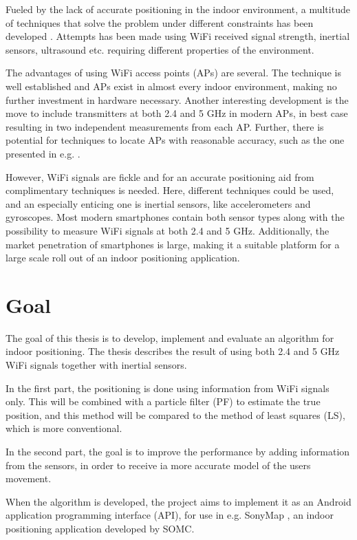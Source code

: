 \documentclass{LTHthesis}
\begin{document}
Fueled by the lack of accurate positioning in the indoor environment, a multitude of techniques that solve the problem under different constraints has been developed \cite{positioning_overview}. Attempts has been made using WiFi received signal strength, inertial sensors, ultrasound etc. requiring different properties of the environment. 

The advantages of using WiFi access points (APs) are several. The technique is well established and APs exist in almost every indoor environment, making no further investment in hardware necessary. Another interesting development is the move to include transmitters at both 2.4 and 5 GHz in modern APs, in best case resulting in two independent measurements from each AP. Further, there is potential for techniques to locate APs with reasonable accuracy, such as the one presented in e.g. \cite{exjobb}. 

However, WiFi signals are fickle and for an accurate positioning aid from complimentary techniques is needed. Here, different techniques could be used, and an especially enticing one is inertial sensors, like accelerometers and gyroscopes. Most modern smartphones contain both sensor types along with the possibility to measure WiFi signals at both 2.4 and 5 GHz. Additionally, the market penetration of smartphones is large, making it a suitable platform for a large scale roll out of an indoor positioning application.
%
\section{Goal}

The goal of this thesis is to develop, implement and evaluate an algorithm for indoor positioning. The thesis describes the result of using both 2.4 and 5 GHz WiFi signals together with inertial sensors.

In the first part, the positioning is done using information from WiFi signals only. This will be combined with a particle filter (PF) to estimate the true position, and this method will be compared to the method of least squares (LS), which is more conventional.

In the second part, the goal is to improve the performance by adding information from the sensors, in order to receive ia more accurate model of the users movement.

When the algorithm is developed, the project aims to implement it as an Android application programming interface (API), for use in e.g. SonyMap \cite{sonymap}, an indoor positioning application developed by SOMC.
\end{document}
